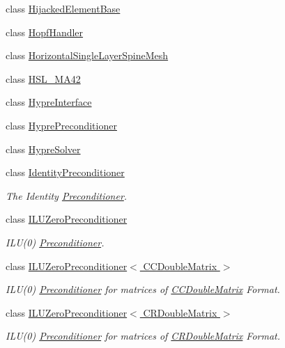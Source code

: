 \begin{DoxyCompactItemize}
class \hyperlink{classoomph_1_1HijackedElementBase}{Hijacked\+Element\+Base}
\item 
class \hyperlink{classoomph_1_1HopfHandler}{Hopf\+Handler}
\item 
class \hyperlink{classoomph_1_1HorizontalSingleLayerSpineMesh}{Horizontal\+Single\+Layer\+Spine\+Mesh}
\item 
class \hyperlink{classoomph_1_1HSL__MA42}{H\+S\+L\+\_\+\+M\+A42}
\item 
class \hyperlink{classoomph_1_1HypreInterface}{Hypre\+Interface}
\item 
class \hyperlink{classoomph_1_1HyprePreconditioner}{Hypre\+Preconditioner}
\item 
class \hyperlink{classoomph_1_1HypreSolver}{Hypre\+Solver}
\item 
class \hyperlink{classoomph_1_1IdentityPreconditioner}{Identity\+Preconditioner}
\begin{DoxyCompactList}\small\item\em The Identity \hyperlink{classoomph_1_1Preconditioner}{Preconditioner}. \end{DoxyCompactList}\item 
class \hyperlink{classoomph_1_1ILUZeroPreconditioner}{I\+L\+U\+Zero\+Preconditioner}
\begin{DoxyCompactList}\small\item\em I\+L\+U(0) \hyperlink{classoomph_1_1Preconditioner}{Preconditioner}. \end{DoxyCompactList}\item 
class \hyperlink{classoomph_1_1ILUZeroPreconditioner_3_01CCDoubleMatrix_01_4}{I\+L\+U\+Zero\+Preconditioner$<$ C\+C\+Double\+Matrix $>$}
\begin{DoxyCompactList}\small\item\em I\+L\+U(0) \hyperlink{classoomph_1_1Preconditioner}{Preconditioner} for matrices of \hyperlink{classoomph_1_1CCDoubleMatrix}{C\+C\+Double\+Matrix} Format. \end{DoxyCompactList}\item 
class \hyperlink{classoomph_1_1ILUZeroPreconditioner_3_01CRDoubleMatrix_01_4}{I\+L\+U\+Zero\+Preconditioner$<$ C\+R\+Double\+Matrix $>$}
\begin{DoxyCompactList}\small\item\em I\+L\+U(0) \hyperlink{classoomph_1_1Preconditioner}{Preconditioner} for matrices of \hyperlink{classoomph_1_1CRDoubleMatrix}{C\+R\+Double\+Matrix} Format. \end{DoxyCompactList}\item 

\end{DoxyCompactItemize}
